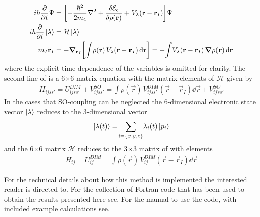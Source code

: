 			\begin{align}
				i\hbar\pdv{t}\Psi &= \qty[-\frac{\hbar^2}{2m_4}\laplacian +\fdv{\mathcal{E}_c}{\rho(\mathbf{r})} + V_\lambda(\vec{r}-\vec{r}_I)]\Psi \nonumber \\
				i\hbar\pdv{t}\ket\lambda  &= \mathcal{H}\ket\lambda \nonumber \\
				m_I\ddot{\vec{r}}_I &= - \grad_{\vec{r}_I}\qty[\int\!\rho(\vec{r})\,V_\lambda(\vec{r}-\vec{r}_I)\dd{\vec{r}}] = -\!\int\!V_\lambda(\vec{r}-\vec{r}_I)\,\grad\rho(\vec{r})\dd{\vec{r}} \label{eq:dyn-el}
			\end{align}
			where the explicit time dependence of the variables is omitted for clarity. The second line of  is a 6$\times$6 matrix equation with the matrix elements of $\mathcal{H}$ given by
			\begin{align}
				H_{ijss'} = U^{DIM}_{ijss'}+V^{SO}_{ijss'} = \int\!\rho(\vec{r})\,V^{DIM}_{ijss'}(\vec{r}-\vec{r}_I)\dd{\vec{r}}+V^{SO}_{ijss'}
			\end{align}
			In the cases that SO-coupling can be neglected the 6-dimensional electronic state vector $\ket{\lambda}$ reduces to the 3-dimensional vector
			\begin{align}
				\ket{\lambda(t)} = \!\sum_{i=\{x,y,z\}} \!\lambda_{i}(t) \ket{p_i}
			\end{align}
			and the 6$\times$6 matrix $\mathcal{H}$ reduces to the 3$\times$3 matrix of  with elements
			\begin{align}
				H_{ij} = U^{DIM}_{ij} = \int\!\rho(\vec{r})\,V^{DIM}_{ij}(\vec{r}-\vec{r}_I)\dd{\vec{r}}
			\end{align}
			
			For the technical details about how this method is implemented the interested reader is directed to. For the collection of Fortran code that has been used to obtain the results presented here see. For the manual to use the code, with included example calculations see.
